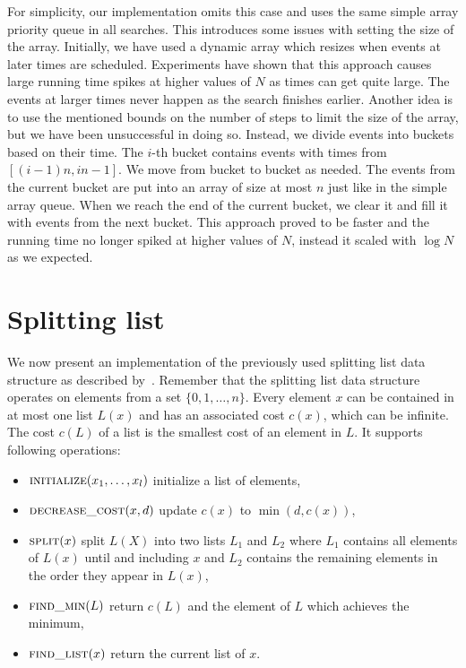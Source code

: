 For simplicity, our implementation omits this case and uses the same simple array priority queue in all searches. This introduces some issues with setting the size of the array. Initially, we have used a dynamic array which resizes when events at later times are scheduled. Experiments have shown that this approach causes large running time spikes at higher values of $N$ as times can get quite large. The events at larger times never happen as the search finishes earlier. Another idea is to use the mentioned bounds on the number of steps to limit the size of the array, but we have been unsuccessful in doing so. Instead, we divide events into buckets based on their time. The $i$-th bucket contains events with times from $[(i-1)n, in-1]$. We move from bucket to bucket as needed. The events from the current bucket are put into an array of size at most $n$ just like in the simple array queue. When we reach the end of the current bucket, we clear it and fill it with events from the next bucket. This approach proved to be faster and the running time no longer spiked at higher values of $N$, instead it scaled with $\log N$ as we expected.

\section{Splitting list}

We now present an implementation of the previously used splitting list data structure as described by~\cite{gabow1985scaling}. Remember that the splitting list data structure operates on elements from a set $\{0, 1, \dots, n\}$. Every element $x$ can be contained in at most one list $L(x)$ and has an associated cost $c(x)$, which can be infinite. The cost $c(L)$ of a list is the smallest cost of an element in $L$. It supports following operations:

\begin{itemize}
    \item $\textsc{initialize}(x_1, \dots, x_l)$ initialize a list of elements,
    \item $\textsc{decrease\_cost}(x, d)$ update $c(x)$ to $\min(d, c(x))$,
    \item $\textsc{split}(x)$ split $L(X)$ into two lists $L_1$ and $L_2$ where $L_1$ contains all elements of $L(x)$ until and including $x$ and $L_2$ contains the remaining elements in the order they appear in $L(x)$,
    \item $\textsc{find\_min}(L)$ return $c(L)$ and the element of $L$ which achieves the minimum,
    \item $\textsc{find\_list}(x)$ return the current list of $x$.
\end{itemize}


